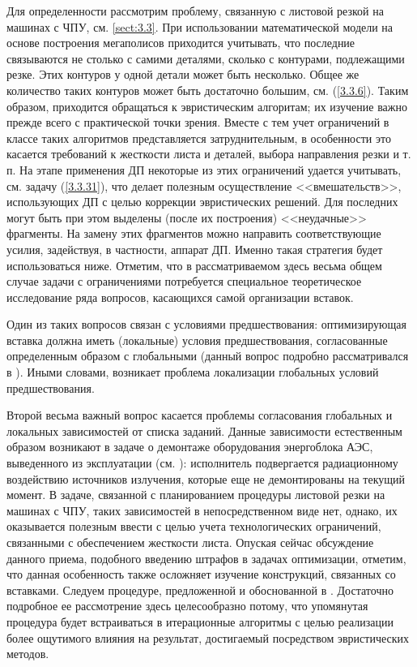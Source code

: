 Для определенности рассмотрим проблему, связанную с
листовой резкой на машинах с ЧПУ,
см. \ref{sect:3.3}.
При использовании
математической модели на основе построения мегаполисов приходится учитывать,
что последние связываются не столько с самими деталями, сколько с контурами,
подлежащими резке.
Этих контуров у одной детали может быть несколько.
Общее же количество таких контуров может быть достаточно большим,
см. (\ref{3.3.6}).
Таким образом, приходится обращаться к эвристическим алгоритам;
их изучение важно прежде всего с практической точки зрения.
Вместе с тем учет ограничений в классе таких алгоритмов представляется
затруднительным,
в особенности это касается требований к жесткости листа
и деталей, выбора направления резки и т. п.
На этапе применения ДП некоторые
из этих ограничений удается учитывать,
см. задачу (\ref{3.3.31}),
что делает полезным осуществление <<вмешательств>>,
использующих ДП
с целью коррекции эвристических решений.
Для последних могут быть при этом выделены
(после их построения)
<<неудачные>> фрагменты.
На замену этих
фрагментов можно направить соответствующие  усилия,
задействуя, в частности, аппарат ДП.
Именно такая стратегия будет использоваться ниже.
Отметим,
что в рассматриваемом здесь весьма общем случае задачи с ограничениями
потребуется специальное теоретическое исследование ряда вопросов,
касающихся самой организации вставок.

Один из таких вопросов  связан с условиями предшествования:
оптимизирующая вставка должна иметь
(локальные)
условия предшествования, согласованные определенным образом с глобальными
(данный вопрос подробно рассматривался в \cite{Cha14`}).
Иными словами, возникает проблема локализации глобальных
условий предшествования.

Второй весьма важный вопрос касается проблемы согласования глобальных и
локальных зависимостей от списка заданий.
Данные зависимости естественным
образом возникают в задаче о демонтаже оборудования энергоблока АЭС,
выведенного из эксплуатации (см. \cite{Cha2`}):
исполнитель подвергается
радиационному воздействию источников излучения,
которые еще не демонтированы на текущий момент.
В задаче, связанной с планированием процедуры листовой
резки на машинах с ЧПУ, таких зависимостей в непосредственном виде нет,
однако, их оказывается полезным ввести с целью учета технологических
ограничений, связанными с обеспечением жесткости листа.
Опуская сейчас
обсуждение данного приема, подобного введению штрафов в задачах оптимизации,
отметим, что данная особенность также осложняет изучение конструкций,
связанных со вставками.
Следуем процедуре, предложенной и обоснованной
в \cite{Cha13`}.
Достаточно подробное ее рассмотрение здесь целесообразно
потому, что упомянутая процедура будет встраиваться в итерационные
алгоритмы с целью реализации более ощутимого влияния на результат,
достигаемый посредством эвристических методов.
